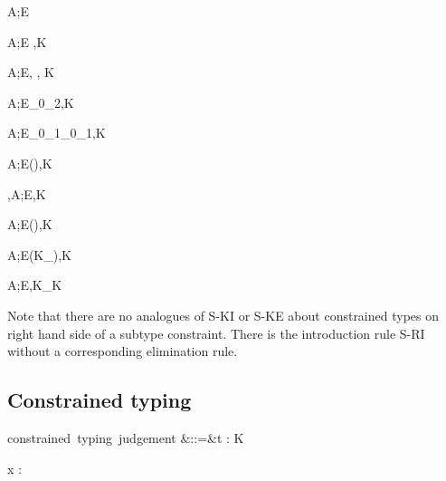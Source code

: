 \documentclass{amsart}
\theoremstyle{definition}
\begin{document}
\infrule[S-vacuous]
{}
{A;E\vdash\emptyset}

{A;E \vdash \tau\Sub\tau,K}

{A;E\vdash \sigma\Sub\tau, \sigma\Sub\tau, K}

{A;E\vdash \tau_0\Sub\tau_2,K}

{A;E\vdash\sigma_0\R\sigma_1\Sub\tau_0\R\tau_1,K}


{A;E\vdash(\All\alpha\sigma)\Sub\tau,K}

{\alpha,A;E\vdash\sigma\Sub\tau,K}

{A;E\vdash\sigma\Sub(\All\alpha\tau),K}

{A;E\vdash (\sigma\Given K_\sigma)\Sub\tau,K}

{A;E\vdash \sigma\Sub\tau,K_\sigma\cup K}

Note that there are no analogues of \textsc{S-KI} or
\textsc{S-KE} about constrained types on right hand side of a
subtype constraint. There is the introduction rule \textsc{S-RI}
without a corresponding elimination rule.

\subsection{Constrained typing}
\begin{syntax}
\mbox{constrained typing judgement}
&::=&\Gamma \vdash t : \tau \Given K
\end{syntax}%
{\Gamma\vdash x : \tau \Given \emptyset}
\end{document}
